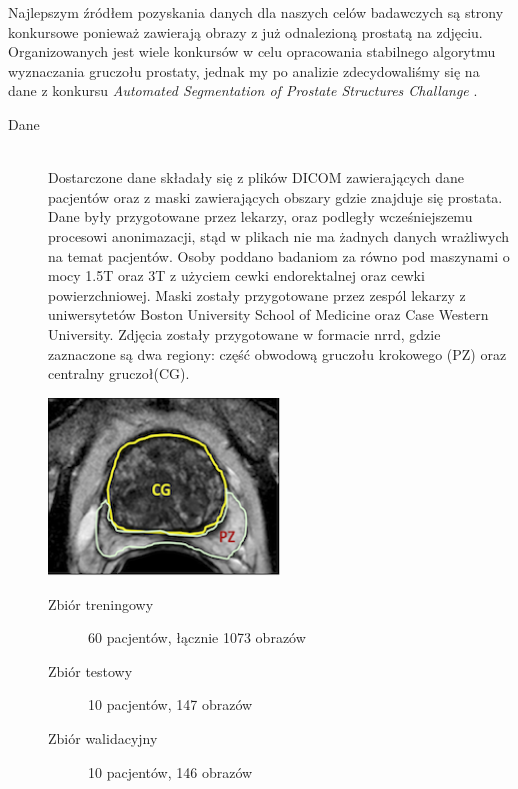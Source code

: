 \documentclass[a4paper,11pt,twoside]{report}
\theoremstyle{definition}
\begin{document}
Najlepszym źródłem pozyskania danych dla naszych celów badawczych są strony konkursowe ponieważ zawierają obrazy z już odnalezioną prostatą na zdjęciu. Organizowanych jest wiele konkursów \cite{konkurs} w celu opracowania stabilnego algorytmu wyznaczania gruczołu prostaty, jednak my po analizie zdecydowaliśmy się na dane z konkursu \textit{Automated Segmentation of Prostate Structures Challange} \cite{konkretny}.

\begin{description}
	\item [Dane] \hfill \\
	Dostarczone dane składały się z plików DICOM zawierających dane pacjentów oraz z maski zawierających obszary gdzie znajduje się prostata. Dane były przygotowane przez lekarzy, oraz podległy wcześniejszemu procesowi anonimazacji, stąd w plikach nie ma żadnych danych wrażliwych na temat pacjentów. Osoby poddano badaniom za równo pod maszynami o mocy 1.5T oraz 3T z użyciem cewki endorektalnej oraz cewki powierzchniowej. Maski zostały przygotowane  przez zespól lekarzy z uniwersytetów Boston University School of Medicine oraz Case Western University. Zdjęcia zostały przygotowane w formacie nrrd, gdzie zaznaczone są dwa regiony: część obwodową gruczołu krokowego (PZ) oraz centralny gruczoł(CG). 
	
	\begin{minipage}{\linewidth}
		\centering
		\includegraphics[width=0.5\textwidth]{segmentation/prostate_seg.png}
	\end{minipage}
	
	\begin{description}
		\item[Zbiór treningowy] 60 pacjentów, łącznie 1073 obrazów
		\item[Zbiór testowy] 10 pacjentów, 147 obrazów
		\item[Zbiór walidacyjny] 10 pacjentów, 146 obrazów
	\end{description}



\end{description}
\end{document}
